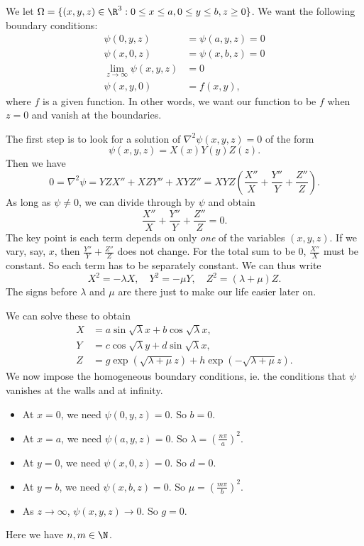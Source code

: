 \documentclass[a4paper]{article}
\begin{document}
We let $\Omega = \{(x, y, z) \in \R^3: 0 \leq x \leq a, 0 \leq y \leq b, z \geq 0\}$. We want the following boundary conditions:
\begin{align*}
  \psi(0, y, z) &= \psi(a, y, z) = 0\\
  \psi(x, 0, z) &= \psi(x, b, z) = 0\\
  \lim_{z\to \infty} \psi(x, y, z) &= 0\\
  \psi(x, y, 0) &= f(x, y),
\end{align*}
where $f$ is a given function. In other words, we want our function to be $f$ when $z = 0$ and vanish at the boundaries.

The first step is to look for a solution of $\nabla^2 \psi(x, y, z) = 0$ of the form
\[
  \psi(x, y, z) = X(x)Y(y)Z(z).
\]
Then we have
\[
  0 = \nabla^2 \psi = YZX'' + XZY'' + XYZ'' = XYZ \left(\frac{X''}{X} + \frac{Y''}{Y} + \frac{Z''}{Z}\right).
\]
As long as $\psi \not= 0$, we can divide through by $\psi$ and obtain
\[
  \frac{X''}{X} + \frac{Y''}{Y} + \frac{Z''}{Z} = 0.
\]
The key point is each term depends on only \emph{one} of the variables $(x, y, z)$. If we vary, say, $x$, then $\frac{Y''}{Y} + \frac{Z''}{Z}$ does not change. For the total sum to be $0$, $\frac{X''}{X}$ must be constant. So each term has to be separately constant. We can thus write
\[
  X^2 = -\lambda X,\quad Y^2 = -\mu Y,\quad Z^2 = (\lambda + \mu) Z.
\]
The signs before $\lambda$ and $\mu$ are there just to make our life easier later on.

We can solve these to obtain
\begin{align*}
  X &= a\sin \sqrt{\lambda} x + b \cos \sqrt{\lambda} x,\\
  Y &= c\cos \sqrt{\lambda} y + d \sin \sqrt{\lambda} x,\\
  Z &= g\exp(\sqrt{\lambda + \mu} z) + h\exp(-\sqrt{\lambda + \mu} z).
\end{align*}
We now impose the homogeneous boundary conditions, ie. the conditions that $\psi$ vanishes at the walls and at infinity.
\begin{itemize}
  \item At $x = 0$, we need $\psi(0, y, z) = 0$. So $b = 0$.
  \item At $x = a$, we need $\psi(a, y, z) = 0$. So $\lambda = \left(\frac{n\pi}{a}\right)^2$.
  \item At $y = 0$, we need $\psi(x, 0, z) = 0$. So $d = 0$.
  \item At $y = b$, we need $\psi(x, b, z) = 0$. So $\mu = \left(\frac{m\pi}{b}\right)^2$.
  \item As $z \to \infty$, $\psi(x, y, z) \to 0$. So $g = 0$.
\end{itemize}
Here we have $n, m \in \N$.
\end{document}
